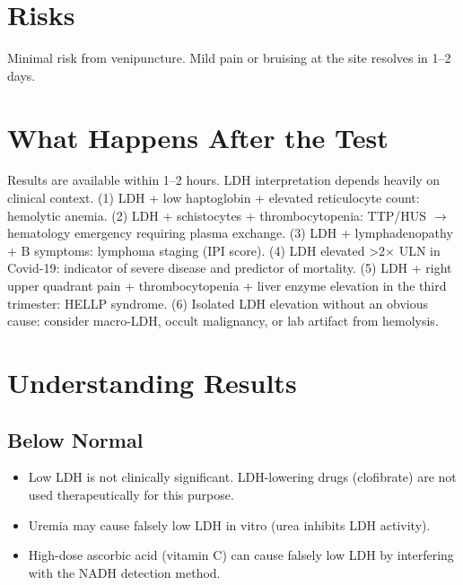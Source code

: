 \section*{Risks}
Minimal risk from venipuncture. Mild pain or bruising at the site resolves in 1--2 days.

\section*{What Happens After the Test}
Results are available within 1--2 hours. LDH interpretation depends heavily on clinical context. (1) LDH + low haptoglobin + elevated reticulocyte count: hemolytic anemia. (2) LDH + schistocytes + thrombocytopenia: TTP/HUS $\rightarrow$ hematology emergency requiring plasma exchange. (3) LDH + lymphadenopathy + B symptoms: lymphoma staging (IPI score). (4) LDH elevated >2$\times$ ULN in Covid-19: indicator of severe disease and predictor of mortality. (5) LDH + right upper quadrant pain + thrombocytopenia + liver enzyme elevation in the third trimester: HELLP syndrome. (6) Isolated LDH elevation without an obvious cause: consider macro-LDH, occult malignancy, or lab artifact from hemolysis.

\section*{Understanding Results}

\subsection*{Below Normal}
\begin{itemize}
  \item Low LDH is not clinically significant. LDH-lowering drugs (clofibrate) are not used therapeutically for this purpose.
  \item Uremia may cause falsely low LDH in vitro (urea inhibits LDH activity).
  \item High-dose ascorbic acid (vitamin C) can cause falsely low LDH by interfering with the NADH detection method.
\end{itemize}

